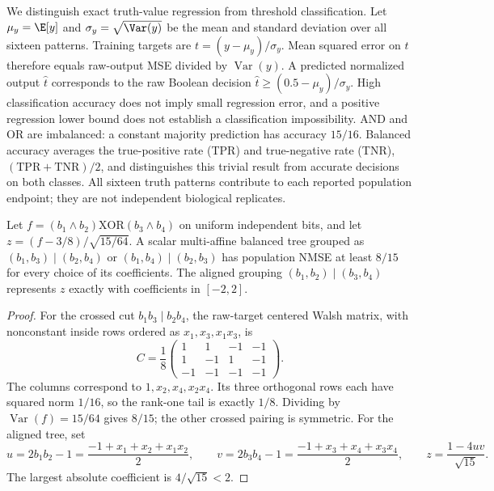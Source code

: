 We distinguish exact truth-value regression from threshold classification.
Let $\mu_y=\E[y]$ and $\sigma_y=\sqrt{\Var(y)}$ be the mean and
standard deviation over all sixteen patterns. Training targets are
$t=(y-\mu_y)/\sigma_y$. Mean squared error on $t$ therefore equals raw-output MSE
divided by $\operatorname{Var}(y)$. A predicted normalized output $\hat t$
corresponds to the raw Boolean decision
$\hat t\geq(0.5-\mu_y)/\sigma_y$. High classification accuracy does not imply
small regression error, and a positive regression lower bound does not
establish a classification impossibility. AND and OR are imbalanced: a
constant majority prediction has accuracy $15/16$. Balanced accuracy averages the true-positive rate (TPR) and true-negative
rate (TNR), $(\mathrm{TPR}+\mathrm{TNR})/2$, and distinguishes this trivial result from
accurate decisions on both classes. All sixteen truth patterns contribute
to each reported population endpoint; they are not independent biological
replicates.

\begin{proposition}
\label{prop:boolean_xor_and}
Let $f=(b_1\land b_2)\mathbin{\mathrm{XOR}}(b_3\land b_4)$ on uniform
independent bits, and let $z=(f-3/8)/\sqrt{15/64}$. A scalar multi-affine
balanced tree grouped as $(b_1,b_3)\mid(b_2,b_4)$ or
$(b_1,b_4)\mid(b_2,b_3)$ has population NMSE at least $8/15$ for every
choice of its coefficients. The aligned grouping
$(b_1,b_2)\mid(b_3,b_4)$ represents $z$ exactly with coefficients in
$[-2,2]$.
\end{proposition}
\begin{proof}
For the crossed cut $b_1b_3\mid b_2b_4$, the raw-target centered Walsh matrix,
with nonconstant inside rows ordered as $x_1,x_3,x_1x_3$, is
\[
 C=\frac18\begin{pmatrix}
 1&1&-1&-1\\
 1&-1&1&-1\\
 -1&-1&-1&-1
 \end{pmatrix}.
\]
The columns correspond to $1,x_2,x_4,x_2x_4$. Its three orthogonal rows each
have squared norm $1/16$, so the rank-one tail is exactly $1/8$.
Dividing by $\operatorname{Var}(f)=15/64$ gives $8/15$; the other crossed
pairing is symmetric. For the aligned tree, set
\[
 u=2b_1b_2-1=\frac{-1+x_1+x_2+x_1x_2}{2},\qquad
 v=2b_3b_4-1=\frac{-1+x_3+x_4+x_3x_4}{2},\qquad
 z=\frac{1-4uv}{\sqrt{15}}.
\]
The largest absolute coefficient is $4/\sqrt{15}<2$.
\end{proof}

